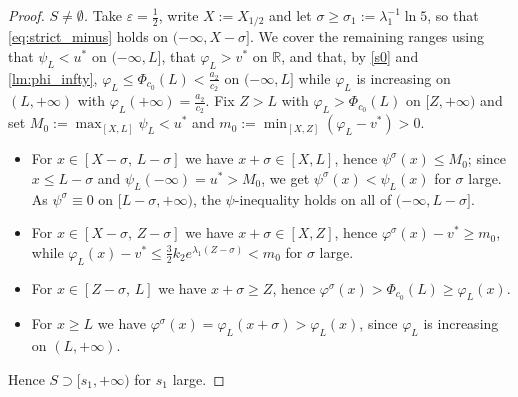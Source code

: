 \documentclass[10pt,a4paper]{amsart}
\begin{document}
\begin{proof}
	\emph{$S\ne\emptyset$.} Take $\varepsilon=\frac12$, write $X:=X_{1/2}$ and let
	$\sigma\ge\sigma_1:=\lambda_1^{-1}\ln5$, so that \eqref{eq:strict_minus} holds
	on $(-\infty,X-\sigma]$. We cover the remaining ranges using that
	$\psi_L<u^*$ on $(-\infty,L]$, that $\varphi_L>v^*$ on $\mathbb{R}$, and that, by
	\eqref{s0} and \cref{lm:phi_infty}, $\varphi_L\le\Phi_{c_0}(L)<\frac{a_2}{c_2}$
	on $(-\infty,L]$ while $\varphi_L$ is increasing on $(L,+\infty)$ with
	$\varphi_L(+\infty)=\frac{a_2}{c_2}$. Fix $Z>L$ with
	$\varphi_L>\Phi_{c_0}(L)$ on $[Z,+\infty)$ and set
	$M_0:=\max_{[X,L]}\psi_L<u^*$ and $m_0:=\min_{[X,Z]}(\varphi_L-v^*)>0$.
	\begin{itemize}
		\item For $x\in[X-\sigma,\,L-\sigma]$ we have $x+\sigma\in[X,L]$, hence
		$\psi^\sigma(x)\le M_0$; since $x\le L-\sigma$ and $\psi_L(-\infty)=u^*>M_0$,
		we get $\psi^\sigma(x)<\psi_L(x)$ for $\sigma$ large. As
		$\psi^\sigma\equiv0$ on $[L-\sigma,+\infty)$, the $\psi$-inequality holds on
		all of $(-\infty,L-\sigma]$.
		\item For $x\in[X-\sigma,\,Z-\sigma]$ we have $x+\sigma\in[X,Z]$, hence
		$\varphi^\sigma(x)-v^*\ge m_0$, while
		$\varphi_L(x)-v^*\le\frac32k_2e^{\lambda_1(Z-\sigma)}<m_0$ for $\sigma$ large.
		\item For $x\in[Z-\sigma,\,L]$ we have $x+\sigma\ge Z$, hence
		$\varphi^\sigma(x)>\Phi_{c_0}(L)\ge\varphi_L(x)$.
		\item For $x\ge L$ we have $\varphi^\sigma(x)=\varphi_L(x+\sigma)>\varphi_L(x)$,
		since $\varphi_L$ is increasing on $(L,+\infty)$.
	\end{itemize}
	Hence $S\supset[s_1,+\infty)$ for $s_1$ large.


\end{proof}
\end{document}
